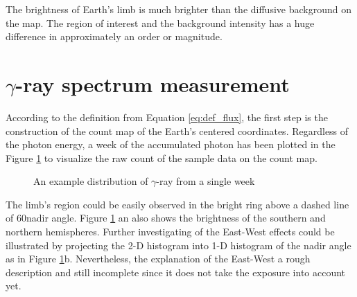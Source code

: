 The brightness of Earth's limb is much brighter than the 
diffusive background on the map. The region of interest and 
the background intensity has a huge difference in approximately
an order or magnitude.


\section{$\gamma$-ray spectrum measurement}

According to the definition from Equation \ref{eq:def_flux}, 
the first step is the construction of the count map of the Earth's 
centered coordinates. Regardless of the photon energy, a week of the 
accumulated photon has been plotted in the Figure \ref{fig:sample_photon_dist} to visualize 
the raw count of the sample data on the count map.

\begin{figure}[h!]
    \centering
        \hfill
        \caption{An example distribution of $\gamma$-ray from a single week}
       \label{fig:sample_photon_dist}
\end{figure}

The limb's region could be easily observed in the bright ring above 
a dashed line of 60\textdegree nadir angle. 
Figure \ref{fig:sample_photon_dist} an also shows the brightness of 
the southern and northern hemispheres. Further investigating of the 
East-West effects could be illustrated by projecting the 2-D histogram 
into 1-D histogram of the nadir angle as in Figure \ref{fig:sample_photon_dist}b.
Nevertheless, the explanation of the East-West a rough description
and still incomplete since it does not take the exposure into account yet.

